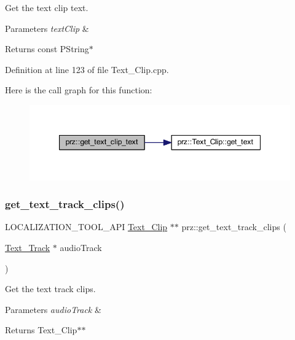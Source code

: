 Get the text clip text. 


\begin{DoxyParams}{Parameters}
{\em text\+Clip} & \\
\hline
\end{DoxyParams}
\begin{DoxyReturn}{Returns}
const P\+String$\ast$ 
\end{DoxyReturn}


Definition at line 123 of file Text\+\_\+\+Clip.\+cpp.

Here is the call graph for this function\+:
\nopagebreak
\begin{figure}[H]
\begin{center}
\leavevmode
\includegraphics[width=347pt]{namespaceprz_a007de1ffd5893fd30640a9117d09245a_cgraph}
\end{center}
\end{figure}
\mbox{\label{namespaceprz_abd2d4f20a28459ce750fa2d4de97ab92}} 
\subsubsection{\texorpdfstring{get\_text\_track\_clips()}{get\_text\_track\_clips()}}
{\footnotesize\ttfamily L\+O\+C\+A\+L\+I\+Z\+A\+T\+I\+O\+N\+\_\+\+T\+O\+O\+L\+\_\+\+A\+PI \mbox{\hyperlink{classprz_1_1_text___clip}{Text\+\_\+\+Clip}} $\ast$$\ast$ prz\+::get\+\_\+text\+\_\+track\+\_\+clips (\begin{DoxyParamCaption}\item[{\mbox{\hyperlink{classprz_1_1_text___track}{Text\+\_\+\+Track}} $\ast$}]{audio\+Track }\end{DoxyParamCaption})}



Get the text track clips. 


\begin{DoxyParams}{Parameters}
{\em audio\+Track} & \\
\hline
\end{DoxyParams}
\begin{DoxyReturn}{Returns}
Text\+\_\+\+Clip$\ast$$\ast$ 
\end{DoxyReturn}


